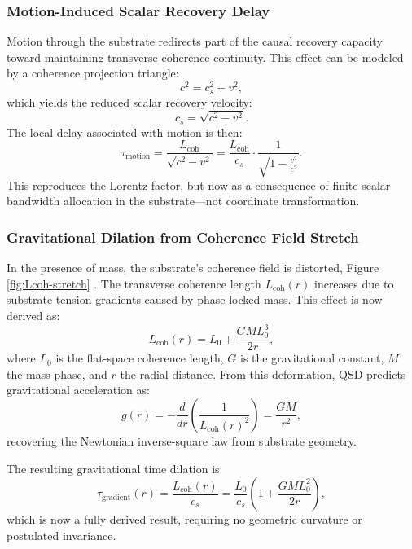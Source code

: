 \documentclass[entropy,article,submit,pdftex,moreauthors]{Definitions/mdpi}
\begin{document}
\subsubsection{Motion-Induced Scalar Recovery Delay}

Motion through the substrate redirects part of the causal recovery capacity toward maintaining transverse coherence continuity. This effect can be modeled by a coherence projection triangle:
\begin{equation}
c^2 = c_s^2 + v^2,
\end{equation}
which yields the reduced scalar recovery velocity:
\begin{equation}
c_s = \sqrt{c^2 - v^2}.
\end{equation}
The local delay associated with motion is then:
\begin{equation}
\tau_{\text{motion}} = \frac{L_{\text{coh}}}{\sqrt{c^2 - v^2}} = \frac{L_{\text{coh}}}{c_s} \cdot \frac{1}{\sqrt{1 - \frac{v^2}{c^2}}}.
\end{equation}
This reproduces the Lorentz factor, but now as a consequence of finite scalar bandwidth allocation in the substrate—not coordinate transformation.

\subsubsection{Gravitational Dilation from Coherence Field Stretch}

In the presence of mass, the substrate’s coherence field is distorted, Figure \ref{fig:Lcoh-stretch} . The transverse coherence length \( L_{\text{coh}}(r) \) increases due to substrate tension gradients caused by phase-locked mass. This effect is now derived as:
\begin{equation}
L_{\text{coh}}(r) = L_0 + \frac{GM L_0^3}{2r},
\end{equation}
where \( L_0 \) is the flat-space coherence length, \( G \) is the gravitational constant, \( M \) the mass phase, and \( r \) the radial distance. From this deformation, QSD predicts gravitational acceleration as:
\begin{equation}
g(r) = -\frac{d}{dr}\left(\frac{1}{L_{\text{coh}}(r)^2}\right) = \frac{GM}{r^2},
\end{equation}
recovering the Newtonian inverse-square law from substrate geometry.

The resulting gravitational time dilation is:
\begin{equation}
\tau_{\text{gradient}}(r) = \frac{L_{\text{coh}}(r)}{c_s} = \frac{L_0}{c_s} \left(1 + \frac{GM L_0^2}{2r}\right),
\end{equation}
which is now a fully derived result, requiring no geometric curvature or postulated invariance.
\end{document}
